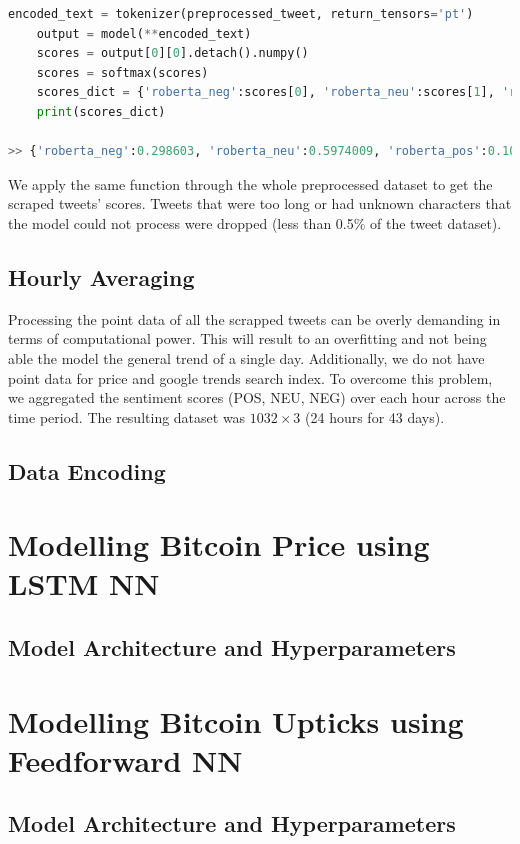 \begin{lstlisting}[language=Python, caption= {Applying the twitter-roberta-base-sentiment model to the preprocessed tweet in (\ref{preprocess_tweet})}, label= roberta_example]
    encoded_text = tokenizer(preprocessed_tweet, return_tensors='pt')
    output = model(**encoded_text)
    scores = output[0][0].detach().numpy()
    scores = softmax(scores)
    scores_dict = {'roberta_neg':scores[0], 'roberta_neu':scores[1], 'roberta_pos':scores[2]}
    print(scores_dict)

>> {'roberta_neg':0.298603, 'roberta_neu':0.5974009, 'roberta_pos':0.10399604}
\end{lstlisting}
We apply the same function through the whole preprocessed dataset to get the scraped tweets' scores. Tweets that were too long or had unknown characters that the model could not process were dropped (less than 0.5\% of the tweet dataset). 
\subsection*{Hourly Averaging}
Processing the point data of all the scrapped tweets can be overly demanding in terms of computational power. This will result to an overfitting and not being able the model the general trend of a single day. Additionally, we do not have point data for price and google trends search index. To overcome this problem, we aggregated the sentiment scores (POS, NEU, NEG) over each hour across the time period. The resulting dataset was $1032 \times 3$ (24 hours for 43 days).

\subsection*{Data Encoding}
\section{Modelling Bitcoin Price using LSTM NN}
\subsection*{Model Architecture and Hyperparameters}
\section{Modelling Bitcoin Upticks using Feedforward NN}
\subsection*{Model Architecture and Hyperparameters}
